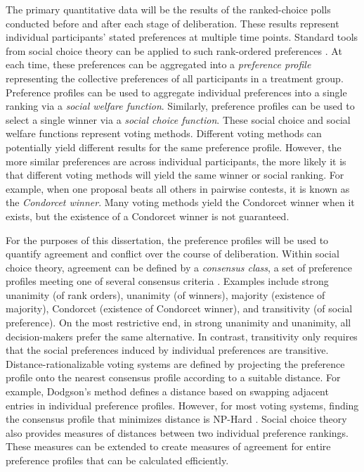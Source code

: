 The primary quantitative data will be the results of the ranked-choice
polls conducted before and after each stage of deliberation.
These results represent individual participants' stated preferences at multiple
time points.
Standard tools from social choice theory can be applied to such rank-ordered
preferences \cite{arrow_social_2012, brandt_computational_2012}.
At each time, these preferences can be aggregated into a {\em preference profile}
representing the collective preferences of all participants in a treatment group.
Preference profiles can be used to aggregate individual preferences into a single
ranking via a {\em social welfare function}.
Similarly, preference profiles can be used to select a single winner via a
{\em social choice function}.
These social choice and social welfare functions represent voting methods.
Different voting methods can potentially yield different results for the same
preference profile.
However, the more similar preferences are across individual participants,
the more likely it is that different voting methods will yield the same winner
or social ranking.
For example, when one proposal beats all others in pairwise contests, it is known as the
{\em Condorcet winner}.
Many voting methods yield the Condorcet winner when it exists, but the existence
of a Condorcet winner is not guaranteed.

For the purposes of this dissertation, the preference profiles will be used
to quantify agreement and conflict over the course of deliberation.
Within social choice theory, agreement can be defined by a {\em consensus class},
a set of preference profiles meeting one of several consensus criteria
\cite{elkind_rationalizations_2016}.
Examples include strong unanimity (of rank orders),
unanimity (of winners),
majority (existence of majority),
Condorcet (existence of Condorcet winner),
and transitivity (of social preference).
On the most restrictive end, in strong unanimity and unanimity,
all decision-makers prefer the same alternative.
In contrast, transitivity only requires that the social preferences induced by
individual preferences are transitive.
Distance-rationalizable voting systems are defined by projecting the preference
profile onto the nearest consensus profile according to a suitable distance.
For example, Dodgson's method \cite{dodgson_method_1876, brandt_computational_2012}
defines a distance based on swapping adjacent entries in individual preference profiles.
However, for most voting systems,
finding the consensus profile that minimizes distance is NP-Hard
\cite{elkind_rationalizations_2016}.
Social choice theory also provides measures of distances between two individual
preference rankings.
These measures can be extended to create measures of agreement for entire
preference profiles that can be calculated efficiently.

